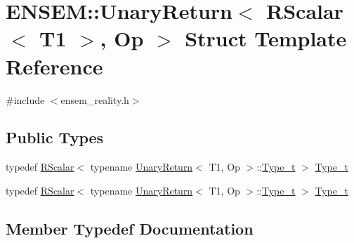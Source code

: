 \hypertarget{structENSEM_1_1UnaryReturn_3_01RScalar_3_01T1_01_4_00_01Op_01_4}{}\section{E\+N\+S\+EM\+:\+:Unary\+Return$<$ R\+Scalar$<$ T1 $>$, Op $>$ Struct Template Reference}
\label{structENSEM_1_1UnaryReturn_3_01RScalar_3_01T1_01_4_00_01Op_01_4}


{\ttfamily \#include $<$ensem\+\_\+reality.\+h$>$}

\subsection*{Public Types}
\begin{DoxyCompactItemize}
\item 
typedef \mbox{\hyperlink{classENSEM_1_1RScalar}{R\+Scalar}}$<$ typename \mbox{\hyperlink{structENSEM_1_1UnaryReturn}{Unary\+Return}}$<$ T1, Op $>$\+::\mbox{\hyperlink{structENSEM_1_1UnaryReturn_3_01RScalar_3_01T1_01_4_00_01Op_01_4_a406bd7c6dcdb1f1ee9e383de2e830d7c}{Type\+\_\+t}} $>$ \mbox{\hyperlink{structENSEM_1_1UnaryReturn_3_01RScalar_3_01T1_01_4_00_01Op_01_4_a406bd7c6dcdb1f1ee9e383de2e830d7c}{Type\+\_\+t}}
\item 
typedef \mbox{\hyperlink{classENSEM_1_1RScalar}{R\+Scalar}}$<$ typename \mbox{\hyperlink{structENSEM_1_1UnaryReturn}{Unary\+Return}}$<$ T1, Op $>$\+::\mbox{\hyperlink{structENSEM_1_1UnaryReturn_3_01RScalar_3_01T1_01_4_00_01Op_01_4_a406bd7c6dcdb1f1ee9e383de2e830d7c}{Type\+\_\+t}} $>$ \mbox{\hyperlink{structENSEM_1_1UnaryReturn_3_01RScalar_3_01T1_01_4_00_01Op_01_4_a406bd7c6dcdb1f1ee9e383de2e830d7c}{Type\+\_\+t}}
\end{DoxyCompactItemize}


\subsection{Member Typedef Documentation}
\mbox{\label{structENSEM_1_1UnaryReturn_3_01RScalar_3_01T1_01_4_00_01Op_01_4_a406bd7c6dcdb1f1ee9e383de2e830d7c}} 
